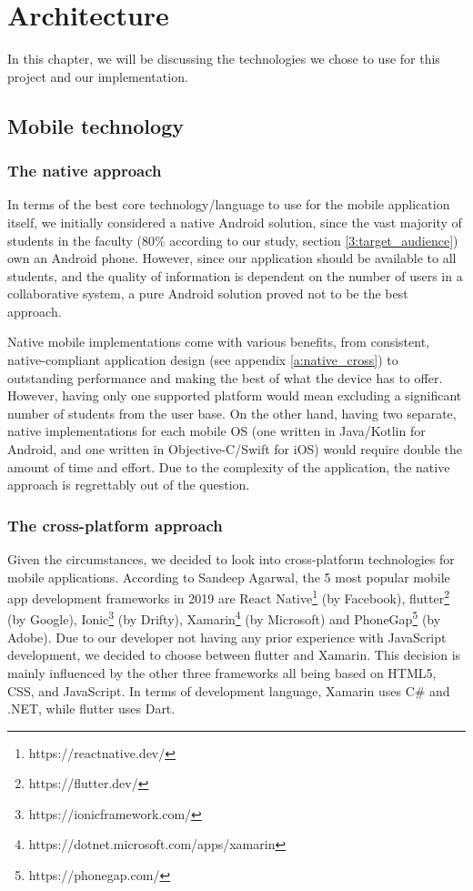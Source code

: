 \chapter{Architecture} \label{chapter5}

In this chapter, we will be discussing the technologies we chose to use for this project and our implementation.

\section{Mobile technology} \label{5:technology}

\subsection{The native approach} \label{5:technology_native}

In terms of the best core technology/language to use for the mobile application itself, we initially considered a native Android solution, since the vast majority of students in the faculty (80\% according to our study, section \ref{3:target_audience}) own an Android phone. However, since our application should be available to all students, and the quality of information is dependent on the number of users in a collaborative system, a pure Android solution proved not to be the best approach.

Native mobile implementations come with various benefits, from consistent, native-compliant application design (see appendix \ref{a:native_cross}) to outstanding performance and making the best of what the device has to offer. However, having only one supported platform would mean excluding a significant number of students from the user base. On the other hand, having two separate, native implementations for each mobile OS (one written in Java/Kotlin for Android, and one written in Objective-C/Swift for iOS) would require double the amount of time and effort. Due to the complexity of the application, the native approach is regrettably out of the question.

\subsection{The cross-platform approach} \label{5:technology_cross}

Given the circumstances, we decided to look into cross-platform technologies for mobile applications. According to Sandeep Agarwal\cite{agarwal2019best}, the 5 most popular mobile app development frameworks in 2019 are React Native\footnote{https://reactnative.dev/} (by Facebook), \gls{flutter}\footnote{https://flutter.dev/} (by Google), Ionic\footnote{https://ionicframework.com/} (by Drifty), Xamarin\footnote{https://dotnet.microsoft.com/apps/xamarin} (by Microsoft) and PhoneGap\footnote{https://phonegap.com/} (by Adobe). Due to our developer not having any prior experience with JavaScript development, we decided to choose between \gls{flutter} and Xamarin. This decision is mainly influenced by the other three frameworks all being based on HTML5, CSS, and JavaScript. In terms of development language, Xamarin uses C\# and .NET, while \gls{flutter} uses Dart.

